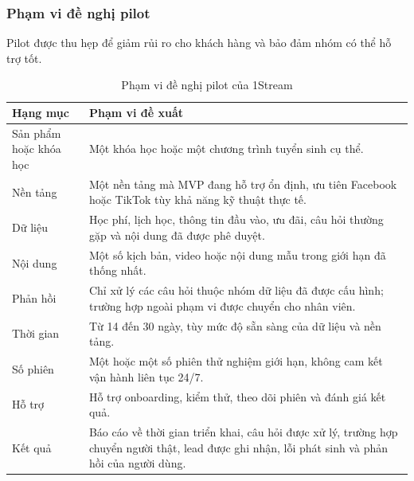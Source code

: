 \subsubsection{Phạm vi đề nghị pilot}

Pilot được thu hẹp để giảm rủi ro cho khách hàng và bảo đảm nhóm có thể hỗ trợ tốt.

\begin{table}[htbp]
    \centering
    \caption{Phạm vi đề nghị pilot của 1Stream}
    \label{tab:first-customer-pilot-offer}
    \begin{tabular}{
        p{}
        p{}
    }
        \hline
        \textbf{Hạng mục}
        & \textbf{Phạm vi đề xuất} \\
        \hline

        Sản phẩm hoặc khóa học
        &
        Một khóa học hoặc một chương trình tuyển sinh cụ thể. \\

        \hline

        Nền tảng
        &
        Một nền tảng mà MVP đang hỗ trợ ổn định, ưu tiên Facebook hoặc TikTok tùy khả năng kỹ thuật thực tế. \\

        \hline

        Dữ liệu
        &
        Học phí, lịch học, thông tin đầu vào, ưu đãi, câu hỏi thường gặp và nội dung đã được phê duyệt. \\

        \hline

        Nội dung
        &
        Một số kịch bản, video hoặc nội dung mẫu trong giới hạn đã thống nhất. \\

        \hline

        Phản hồi
        &
        Chỉ xử lý các câu hỏi thuộc nhóm dữ liệu đã được cấu hình; trường hợp ngoài phạm vi được chuyển cho nhân viên. \\

        \hline

        Thời gian
        &
        Từ 14 đến 30 ngày, tùy mức độ sẵn sàng của dữ liệu và nền tảng. \\

        \hline

        Số phiên
        &
        Một hoặc một số phiên thử nghiệm giới hạn, không cam kết vận hành liên tục 24/7. \\

        \hline

        Hỗ trợ
        &
        Hỗ trợ onboarding, kiểm thử, theo dõi phiên và đánh giá kết quả. \\

        \hline

        Kết quả
        &
        Báo cáo về thời gian triển khai, câu hỏi được xử lý, trường hợp chuyển người thật, lead được ghi nhận, lỗi phát sinh và phản hồi của người dùng. \\

        \hline
    \end{tabular}
\end{table}


